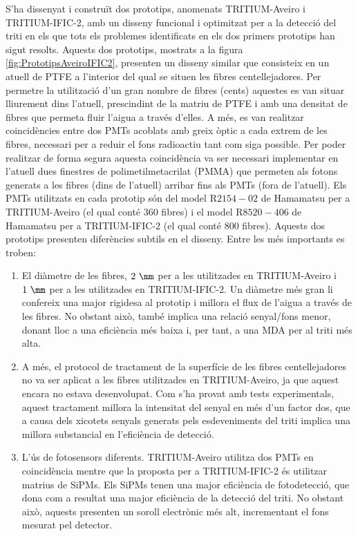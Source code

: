 S'ha dissenyat i construït dos prototips, anomenats TRITIUM-Aveiro i TRITIUM-IFIC-2, amb un disseny funcional i optimitzat per a la detecció del triti en els que tots els problemes identificats en els dos primers prototips han sigut resolts. Aquests dos prototips, mostrats a la figura \ref{fig:PrototipsAveiroIFIC2}, presenten un disseny similar que consisteix en un atuell de PTFE a l'interior del qual se situen les fibres centellejadores. Per permetre la utilització d'un gran nombre de fibres (cents) aquestes es van situar lliurement dins l'atuell, prescindint de la matriu de PTFE i amb una densitat de fibres que permeta fluir l'aigua a través d'elles. A més, es van realitzar coincidències entre dos PMTs acoblats amb greix òptic a cada extrem de les fibres, necessari per a reduir el fons radioactiu tant com siga possible. Per poder realitzar de forma segura aquesta coincidència va ser necessari implementar en l'atuell dues finestres de polimetilmetacrilat (PMMA) que permeten als fotons generats a les fibres (dins de l'atuell) arribar fins als PMTs (fora de l'atuell). Els PMTs utilitzats en cada prototip són del model R$2154-02$ de Hamamatsu \cite{DataSheetPMTsAveiro} per a TRITIUM-Aveiro (el qual conté 360 fibres) i el model R$8520-406$ de Hamamatsu \cite{DataSheetPMTs} per a TRITIUM-IFIC-2 (el qual conté 800 fibres). Aquests dos prototips presenten diferències subtils en el disseny. Entre les més importants es troben:
\begin{enumerate}
\item{} El diàmetre de les fibres, $2~\mm$ per a les utilitzades en TRITIUM-Aveiro i $1~\mm$ per a les utilitzades en TRITIUM-IFIC-2. Un diàmetre més gran li confereix una major rigidesa al prototip i millora el flux de l'aigua a través de les fibres. No obstant això, també implica una relació senyal/fons menor, donant lloc a una eficiència més baixa i, per tant, a una MDA per al triti més alta.
\item{} A més, el protocol de tractament de la superfície de les fibres centellejadores no va ser aplicat a les fibres utilitzades en TRITIUM-Aveiro, ja que aquest encara no estava desenvolupat. Com s'ha provat amb tests experimentals, aquest tractament millora la intensitat del senyal en més d'un factor dos, que a causa dels xicotets senyals generats pels esdeveniments del triti implica una millora substancial en l'eficiència de detecció.
\item{} L'ús de fotosensors diferents. TRITIUM-Aveiro utilitza dos PMTs en coincidència mentre que la proposta per a TRITIUM-IFIC-2 és utilitzar matrius de SiPMs. Els SiPMs tenen una major eficiència de fotodetecció, que dona com a resultat una major eficiència de la detecció del triti. No obstant això, aquests presenten un soroll electrònic més alt, incrementant el fons mesurat pel detector. %
\end{enumerate} 
